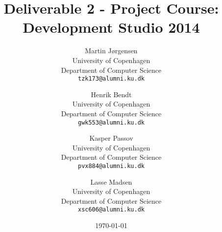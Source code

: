 \documentclass[a4paper,11pt]{article}
\title{Deliverable 2 - Project Course: Development Studio 2014}
\author
{
    Martin Jørgensen \\
    University of Copenhagen \\
    Department of Computer Science \\
    {\tt tzk173@alumni.ku.dk}
    \and
    Henrik Bendt \\
    University of Copenhagen \\
    Department of Computer Science \\
    {\tt gwk553@alumni.ku.dk}
    \and
    Kasper Passov \\
    University of Copenhagen \\
    Department of Computer Science \\
    {\tt pvx884@alumni.ku.dk}
    \and
    Lasse Madsen \\
    University of Copenhagen \\
    Department of Computer Science \\
    {\tt xsc606@alumni.ku.dk}
}
\date{\today}
\begin{document}
\maketitle

\tableofcontents
\pagebreak

%
\end{document}
